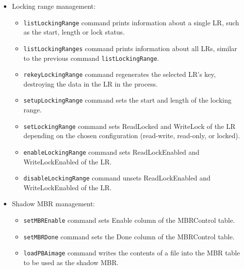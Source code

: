 \begin{itemize}
    \item Locking range management: \begin{itemize}
\item \verb|listLockingRange| command prints information about a single LR, such as the start, length or lock status.
\item \verb|listLockingRanges| command prints information about all LRs, similar to the previous command \verb|listLockingRange|.
\item \verb|rekeyLockingRange| command regenerates the selected LR's key, destroying the data in the LR in the process.
\item \verb|setupLockingRange| command sets the start and length of the locking range.
\item \verb|setLockingRange| command sets ReadLocked and WriteLock of the LR depending on the chosen configuration (read-write, read-only, or locked).
\item \verb|enableLockingRange| command sets ReadLockEnabled and WriteLockEnabled of the LR. 
\item \verb|disableLockingRange| command unsets ReadLockEnabled and WriteLockEnabled of the LR. 
    \end{itemize}
    
    \item Shadow MBR management: \begin{itemize}
\item \verb|setMBREnable| command sets Enable column of the MBRControl table.
\item \verb|setMBRDone| command sets the Done column of the MBRControl table.
\item \verb|loadPBAimage| command writes the contents of a file into the MBR table to be used as the shadow MBR.
    \end{itemize}

    

\end{itemize}
